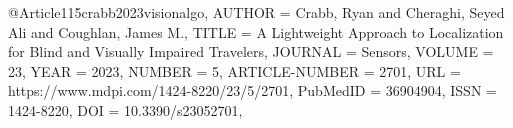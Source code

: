 @Article{115crabb2023visionalgo,
AUTHOR = {Crabb, Ryan and Cheraghi, Seyed Ali and Coughlan, James M.},
TITLE = {A Lightweight Approach to Localization for Blind and Visually Impaired Travelers},
JOURNAL = {Sensors},
VOLUME = {23},
YEAR = {2023},
NUMBER = {5},
ARTICLE-NUMBER = {2701},
URL = {https://www.mdpi.com/1424-8220/23/5/2701},
PubMedID = {36904904},
ISSN = {1424-8220},
DOI = {10.3390/s23052701},}